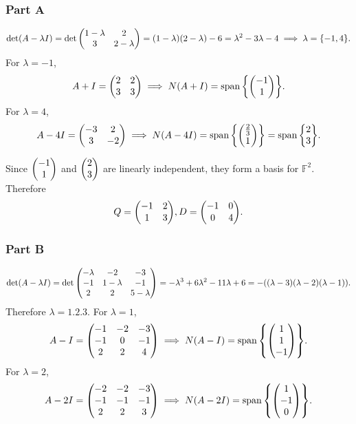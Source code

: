 \documentclass[12pt,titlepage]{extarticle}
\begin{document}
\subsubsection*{Part A}
\[
    \det(A - \lambda I) = \det\mqty(1 - \lambda & 2 \\ 3 & 2 - \lambda) = (1-\lambda)(2-\lambda) - 6 = \lambda^2 - 3 \lambda - 4 \implies \lambda = \qty{-1, 4}
.\]
For $\lambda = -1$,
\[
    A + I = \mqty(2 & 2 \\ 3 & 3) \implies N(A + I) = \spann\qty{\mqty(-1 \\ 1)}
.\]
For $\lambda = 4$,
\[
    A - 4I = \mqty(-3 & 2 \\ 3 & -2) \implies N(A - 4I) = \spann\qty{\mqty(\frac{2}{3} \\ 1)} = \spann\qty{\mqty{2 \\ 3}}
.\]

Since $\mqty(-1 \\ 1)$ and $\mqty(2 \\ 3)$ are linearly independent, they form a basis for $\mathbb{F}^2$. Therefore
\[
    Q = \mqty(
        -1 & 2 \\
        1 & 3
    ),
    D = \mqty(
        \dmat[0]{-1, 4}
    )
.\]

\subsubsection*{Part B}
\[
    \det(A - \lambda I) = \det\mqty(
    -\lambda & -2 & -3 \\
    -1 & 1-\lambda & -1 \\
    2 & 2 & 5 - \lambda
    ) = -\lambda ^3+6 \lambda ^2-11 \lambda +6 = -((\lambda -3) (\lambda -2) (\lambda -1))
.\]
Therefore $\lambda = \qty{1, 2, 3}$. For $\lambda = 1$,
\[
    A - I = \mqty(
        -1 & -2 & -3 \\
         -1 & 0 & -1 \\
         2 & 2 & 4 \\
         ) \implies N(A - I) = \spann\qty{
             \mqty(1 \\ 1 \\ -1)
         }
.\]
For $\lambda = 2$,
\[
    A - 2 I = \mqty(
        -2 & -2 & -3 \\
         -1 & -1 & -1 \\
         2 & 2 & 3 \\
    ) \implies N(A - 2I) = \spann\qty{
        \mqty(1 \\ -1 \\ 0)
    }
.\]
\end{document}
